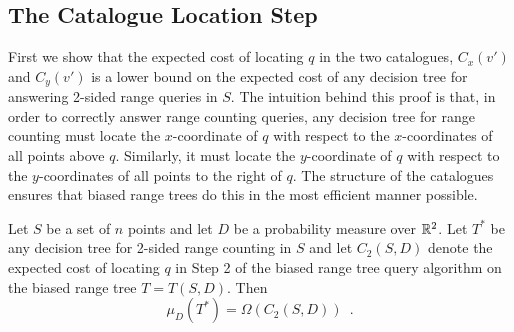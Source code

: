 \documentclass[charterfonts]{patmorin}
\begin{document}
\subsection{The Catalogue Location Step}

First we show that the expected cost of locating $q$ in the two
catalogues, $C_x(v')$ and $C_y(v')$ is
a lower bound on the expected cost of any decision tree for answering
2-sided range queries in $S$.  The intuition behind this proof is
that, in order to correctly answer range counting queries, any decision tree
for range counting must locate the $x$-coordinate of $q$
with respect to the $x$-coordinates of all points above $q$.  
Similarly, it must locate the $y$-coordinate of $q$ with respect to
the $y$-coordinates of all points to the right of $q$.  The structure
of the catalogues ensures that biased range trees do this in the most
efficient manner possible.
 

\begin{lem}
Let $S$ be a set of $n$ points and let $D$ be a probability measure
over $\mathbb{R}^2$.
Let $T^*$ be any decision tree for 2-sided range counting in $S$ and let
$C_2(S,D)$ denote the expected cost of locating $q$ in Step 2 of the
biased range tree query algorithm on the biased range tree $T=T(S,D)$. 
Then
\[
  \mu_D(T^*) = \Omega(C_2(S,D)) \enspace .
\] 
\end{lem}
\end{document}
